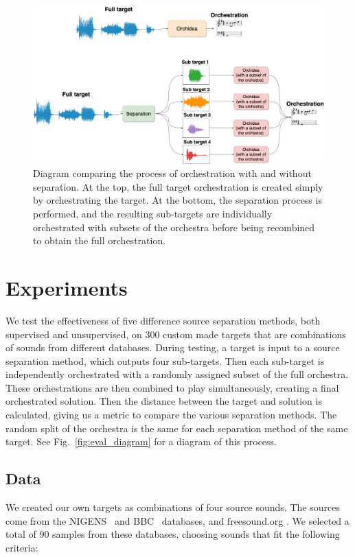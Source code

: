 \documentclass{article}
\begin{document}
  \begin{figure}[t]
    \centering
      \includegraphics[width=\textwidth]{figures/diagram.png}
      \caption{Diagram comparing the process of orchestration with and without separation. At the top, the full target orchestration is created simply by orchestrating the target. At the bottom, the separation process is performed, and the resulting sub-targets are individually orchestrated with subsets of the orchestra before being recombined to obtain the full orchestration.}\label{fig:full_diagram}
  \end{figure}

\section{Experiments}\label{sec:experiments}
  
  We test the effectiveness of five difference source separation methods, both supervised and unsupervised, on 300 custom made targets that are combinations of sounds from different databases. During testing, a target is input to a source separation method, which outputs four sub-targets. Then each sub-target is independently orchestrated with a randomly assigned subset of the full orchestra. These orchestrations are then combined to play simultaneously, creating a final orchestrated solution. Then the distance between the target and solution is calculated, giving us a metric to compare the various separation methods. The random split of the orchestra is the same for each separation method of the same target. See Fig.~\ref{fig:eval_diagram} for a diagram of this process.
  
    \subsection{Data}\label{subsec:data}
    We created our own targets as combinations of four source sounds. The sources come from the NIGENS~\cite{NIGENS} and BBC~\cite{BBC} databases, and freesound.org \cite{freesound}. We selected a total of 90 samples from these databases, choosing sounds that fit the following criteria: 
    
\end{document}
